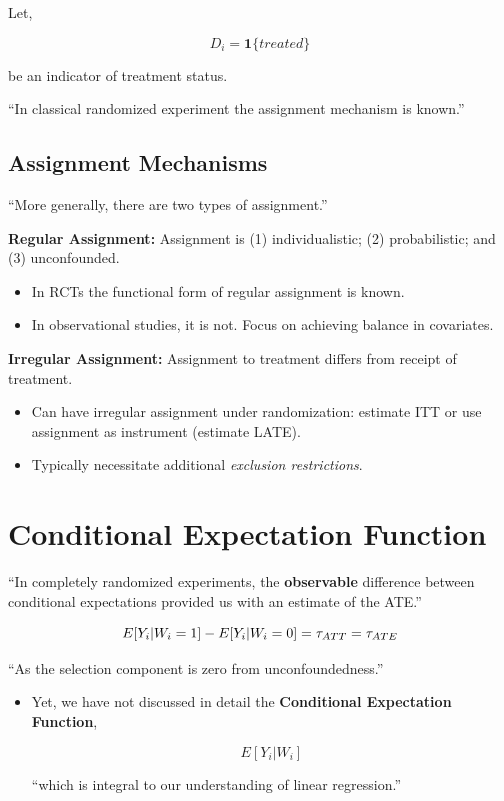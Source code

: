 \documentclass[
  letterpaper,
  DIV=11,
  numbers=noendperiod]{scrreprt}
\providecommand{\tightlist}{%
  \setlength{\itemsep}{0pt}\setlength{\parskip}{0pt}}\usepackage{longtable,booktabs,array}
\theoremstyle{definition}
\theoremstyle{remark}
\begin{document}
Let,

\[
D_i = \mathbf{1}\{treated\}
\]

be an indicator of treatment status.

``In classical randomized experiment the assignment mechanism is
known.''

\subsection{Assignment Mechanisms}\label{assignment-mechanisms}

``More generally, there are two types of assignment.''

\textbf{Regular Assignment:} Assignment is (1) individualistic; (2)
probabilistic; and (3) unconfounded.

\begin{itemize}
\tightlist
\item
  In RCTs the functional form of regular assignment is known.
\item
  In observational studies, it is not. Focus on achieving balance in
  covariates.
\end{itemize}

\textbf{Irregular Assignment:} Assignment to treatment differs from
receipt of treatment.

\begin{itemize}
\item
  Can have irregular assignment under randomization: estimate ITT or use
  assignment as instrument (estimate LATE).
\item
  Typically necessitate additional \emph{exclusion restrictions}.
\end{itemize}

\section{Conditional Expectation
Function}\label{conditional-expectation-function}

``In completely randomized experiments, the \textbf{observable}
difference between conditional expectations provided us with an estimate
of the ATE.''

\[
E[Y_i|W_i=1] - E[Y_i|W_i=0] = \tau_{\scriptsize{ATT}} = \tau_{\scriptsize{ATE}}
\]

``As the selection component is zero from unconfoundedness.''

\begin{itemize}
\item
  Yet, we have not discussed in detail the \textbf{Conditional
  Expectation Function},

  \[
  E[Y_i|W_i]
  \]

  ``which is integral to our understanding of linear regression.''
\end{itemize}
\end{document}
